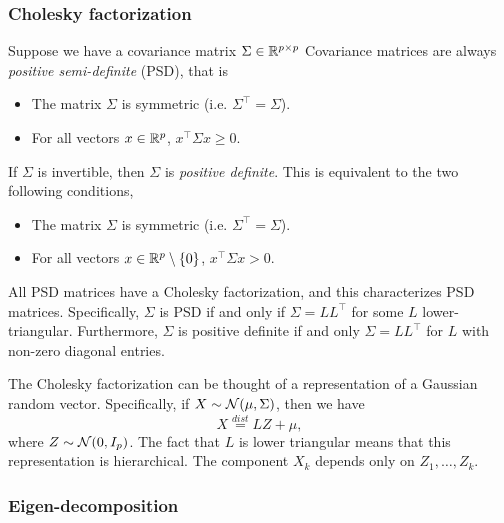 \subsubsection*{Cholesky factorization}

Suppose we have a covariance matrix $\Sigma \in \mathbb{R}^{p \times p}$ Covariance matrices are always \emph{positive semi-definite} (PSD), that is
\begin{itemize}
    \item The matrix $\Sigma$ is symmetric (i.e. $\Sigma^\top = \Sigma$).
    \item For all vectors $x \in \mathbb{R}^p$, $x^\top \Sigma x \ge 0$.
\end{itemize}
If $\Sigma$ is invertible, then $\Sigma$ is \emph{positive definite}. This is equivalent to the two following conditions,
\begin{itemize}
    \item The matrix $\Sigma$ is symmetric (i.e. $\Sigma^\top = \Sigma$).
    \item For all vectors $x \in \mathbb{R}^p \setminus \{0\}$, $x^\top \Sigma x > 0$.
\end{itemize}
All PSD matrices have a Cholesky factorization, and this characterizes PSD matrices. Specifically, $\Sigma$ is PSD if and only if $\Sigma = LL^\top$ for some $L$  lower-triangular. Furthermore, $\Sigma$ is positive definite if and only $\Sigma = LL^\top$ for $L$ with non-zero diagonal entries. 

The Cholesky factorization can be thought of a representation of a Gaussian random vector. Specifically, if $X \sim {\mathcal N}(\mu,\Sigma)$, then we have 
\[X \stackrel{dist}{=} LZ + \mu, \]
where $Z \sim {\mathcal N}(0,I_p)$. The fact that $L$ is lower triangular means that this representation is hierarchical. The component $X_k$ depends only on  $Z_1,\ldots,Z_k$.

\subsubsection*{Eigen-decomposition}

